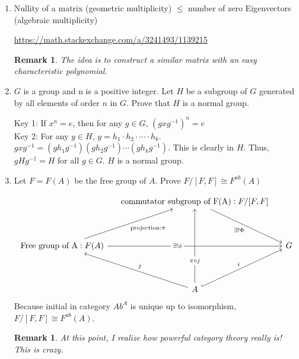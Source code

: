 \documentclass{article}
\newenvironment{solution}{
  \begin{tcolorbox}[mysolutionbox]
}{
  \end{tcolorbox}
}
\newtheorem{remark}[theorem]{Remark}
\begin{document}
\begin{enumerate}
    \item Nullity of a matrix (geometric multiplicity)  $\leq$ number of zero Eigenvectors (algebraic multiplicity)
    \begin{solution}
    \href{https://math.stackexchange.com/a/3241493/1139215}{https://math.stackexchange.com/a/3241493/1139215}
    \end{solution}
    \begin{remark}
        The idea is to construct a similar matrix with an easy characteristic  polynomial.
    \end{remark}
    \item $G$ is a group and n is a positive integer. Let $H$ be a subgroup of $G$ generated by all elements of order $n$ in $G$. Prove that $H$ is a normal group. 
    \begin{solution}
    Key 1: If $x^n=e$, then for any $g \in G$, $(gxg^{-1})^n=e$
    \\
    Key 2: For any $y \in H$, $y=h_1 \cdot h_2 \cdot \cdots \cdot h_k$. $gxg^{-1}=(gh_1g^{-1})(gh_2g^{-1}) \cdots (gh_kg^{-1})$. This is clearly in $H$. Thus, $gHg^{-1}=H$ for all $g \in G$. $H$ is a normal group. 
    \end{solution}
    \item Let $F=F(A)$ be the free group of $A$. Prove $F/[F,F]\cong F^{ab}(A)$
    \begin{solution}
        \[\begin{tikzcd}[column sep=tiny]
	&& {\text{commutator subgroup of F(A)}:F/[F,F]} \\
	\\
	{\text{Free group of A}: F(A)} &&&& G \\
	\\
	&& A
	\arrow["{\exists! \Phi}"', from=1-3, to=3-5]
	\arrow["{\text{projection}:\pi}"', from=3-1, to=1-3]
	\arrow["{\exists !\phi}"{description, pos=0.4}, from=3-1, to=3-5]
	\arrow["{\pi \circ j}"{description, pos=0.3}, from=5-3, to=1-3]
	\arrow["j"', from=5-3, to=3-1]
	\arrow["i", hook, from=5-3, to=3-5]
\end{tikzcd}\]
    Because initial in category $Ab^{A}$ is unique up to isomorphism, $F/[F,F]\cong F^{ab}(A)$. 
    \end{solution}
    \begin{remark}
        At this point, I realize how powerful category theory really is! This is crazy. 
    \end{remark}
    \end{enumerate}
\end{document}
